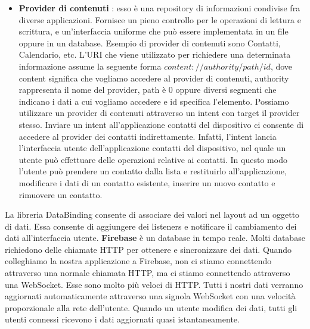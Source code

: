 \documentclass[12pt]{report}
\begin{document}
\begin{itemize}
\item \textbf{Provider di contenuti} : esso è una repository di informazioni condivise fra diverse applicazioni. Fornisce un pieno controllo per le operazioni di lettura e scrittura, e un'interfaccia uniforme che può essere implementata in un file oppure in un database. Esempio di provider di contenuti sono Contatti, Calendario, etc. L'URI che viene utilizzato per richiedere una determinata informazione assume la seguente forma $content://authority/path/id$, dove content significa che vogliamo accedere al provider di contenuti, authority rappresenta il nome del provider, path è 0 oppure diversi segmenti che indicano i dati a cui vogliamo accedere e id specifica l'elemento. Possiamo utilizzare un provider di contenuti attraverso un intent con target il provider stesso. Inviare un intent all'applicazione contatti del dispositivo ci consente di accedere al provider dei contatti indirettamente. Infatti, l'intent lancia l'interfaccia utente dell'applicazione contatti del dispositivo, nel quale un utente può effettuare delle operazioni relative ai contatti. In questo modo l'utente può prendere un contatto dalla lista e restituirlo all'applicazione, modificare i dati di un contatto esistente, inserire un nuovo contatto e rimuovere un contatto.
\end{itemize}
La libreria DataBinding consente di associare dei valori nel layout ad un oggetto di dati. Essa consente di aggiungere dei listeners e notificare il cambiamento dei dati all'interfaccia utente. \textbf{Firebase} è un database in tempo reale. Molti database richiedono delle chiamate HTTP per ottenere e sincronizzare dei dati. Quando colleghiamo la nostra applicazione a Firebase, non ci stiamo connettendo attraverso una normale chiamata HTTP, ma ci stiamo connettendo attraverso una WebSocket. Esse sono molto più veloci di HTTP. Tutti i nostri dati verranno aggiornati automaticamente attraverso una signola WebSocket con una velocità proporzionale alla rete dell'utente. Quando un utente modifica dei dati, tutti gli utenti connessi ricevono i dati aggiornati quasi istantaneamente.
\end{document}

